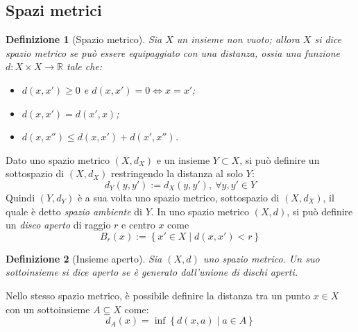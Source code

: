 \documentclass[12pt]{scrartcl}
\theoremstyle{style}
\newtheorem{definizione}{Definizione}[section]
\numberwithin{equation}{subsection}
\begin{document}
\subsection{Spazi metrici}
\begin{definizione}
	[Spazio metrico]
Sia $X$ un insieme non vuoto; allora $X$ si dice spazio metrico se pu\`o essere equipaggiato con una \textit{distanza}, ossia una funzione $d : X \times X \to \mathbb{R}$ tale che:
\begin{itemize}
	\item $d(x,x') \ge  0 $ e $d(x,x') = 0 \iff x=x'$;
	\item $d(x,x') = d(x',x)$;
	\item $d(x,x'') \le  d(x,x') + d(x',x'')$.
\end{itemize}
\end{definizione}
\noindent Dato uno spazio metrico $(X,d_X)$ e un insieme $Y \subset  X$, si pu\`o definire un sottospazio di $(X,d_X)$ restringendo la distanza al solo $Y$:
\[
d_Y (y,y') := d_X(y,y'), \ \forall y,y' \in Y
\] 
Quindi $(Y,d_Y)$ \`e a sua volta uno spazio metrico, sottospazio di $(X,d_X)$, il quale \`e detto \textit{spazio ambiente} di $Y$.
In uno spazio metrico $(X,d)$, si pu\`o definire un \textit{disco aperto} di raggio $r$ e centro $x$ come
\[
B_r(x) := \left\{ x' \in X  \mid d(x,x') < r \right\} 
\] 
\begin{definizione}
	[Insieme aperto]
	Sia $(X,d)$ uno spazio metrico. Un suo sottoinsieme si dice aperto se \`e generato dall'unione di dischi aperti.
\end{definizione}
\noindent Nello stesso spazio metrico, \`e possibile definire la distanza tra un punto $x \in X$ con un sottoinsieme $A \subseteq X$ come:
\begin{equation}
	d_A(x) = \inf \left\{ d(x,a)  \mid a \in A \right\}   
\end{equation}
\end{document}
